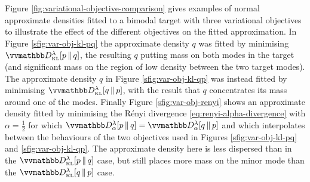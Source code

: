 Figure \ref{fig:variational-objective-comparison} gives examples of normal approximate densities fitted to a bimodal target with three variational objectives to illustrate the effect of the different objectives on the fitted approximation. In Figure \ref{sfig:var-obj-kl-pq} the approximate density $q$ was fitted by minimising $\kldiv[\lambda]{\tgtdens}{q}$, the resulting $q$ putting mass on both modes in the target (and significant mass on the region of low density between the two target modes). The approximate density $q$ in Figure \ref{sfig:var-obj-kl-qp} was instead fitted by minimising $\kldiv[\lambda]{q}{\tgtdens}$, with the result that $q$ concentrates its mass around one of the modes. Finally Figure \ref{sfig:var-obj-renyi} shows an approximate density fitted by minimising the R\'{e}nyi divergence \eqref{eq:renyi-alpha-divergence} with $\alpha = \frac{1}{2}$ for which $\rdiv[\lambda]{\alpha}{\tgtdens}{q} = \rdiv[\lambda]{\alpha}{q}{\tgtdens}$ and which interpolates between the behaviours of the two objectives used in Figures \ref{sfig:var-obj-kl-pq} and \ref{sfig:var-obj-kl-qp}. The approximate density here is less dispersed than in the $\kldiv[\lambda]{\tgtdens}{q}$ case, but still places more mass on the minor mode than the $\kldiv[\lambda]{q}{\tgtdens}$ case.

